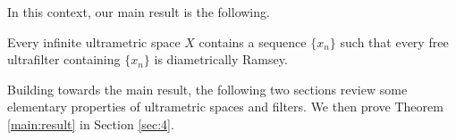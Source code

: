 In this context, our main result is the following.
\begin{theorem}
\label{main:result}
Every infinite ultrametric space \( X \) contains a sequence \( \{x_{n}\} \) such that every free ultrafilter containing \( \{x_{n}\} \) is diametrically Ramsey.
\end{theorem}

Building towards the main result, the following two sections review some elementary properties of ultrametric spaces and filters. We then prove Theorem \ref{main:result} in Section \ref{sec:4}.
